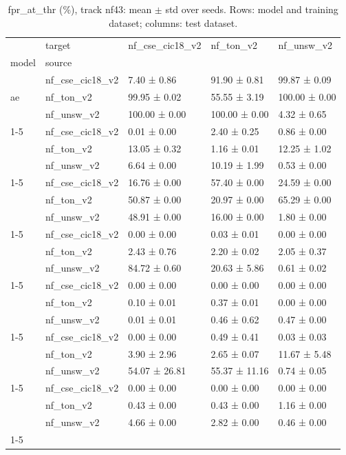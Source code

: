 \begin{table}
\caption{fpr_at_thr (\%), track nf43: mean $\pm$ std over seeds. Rows: model and training dataset; columns: test dataset.}
\label{tab:matrix_nf43_fpr_at_thr}
\begin{tabular}{lllll}
\toprule
 & target & nf_cse_cic18_v2 & nf_ton_v2 & nf_unsw_v2 \\
model & source &  &  &  \\
\midrule
\multirow[t]{3}{*}{ae} & nf_cse_cic18_v2 & 7.40 ± 0.86 & 91.90 ± 0.81 & 99.87 ± 0.09 \\
 & nf_ton_v2 & 99.95 ± 0.02 & 55.55 ± 3.19 & 100.00 ± 0.00 \\
 & nf_unsw_v2 & 100.00 ± 0.00 & 100.00 ± 0.00 & 4.32 ± 0.65 \\
\cline{1-5}
\multirow[t]{3}{*}{dt} & nf_cse_cic18_v2 & 0.01 ± 0.00 & 2.40 ± 0.25 & 0.86 ± 0.00 \\
 & nf_ton_v2 & 13.05 ± 0.32 & 1.16 ± 0.01 & 12.25 ± 1.02 \\
 & nf_unsw_v2 & 6.64 ± 0.00 & 10.19 ± 1.99 & 0.53 ± 0.00 \\
\cline{1-5}
\multirow[t]{3}{*}{lda} & nf_cse_cic18_v2 & 16.76 ± 0.00 & 57.40 ± 0.00 & 24.59 ± 0.00 \\
 & nf_ton_v2 & 50.87 ± 0.00 & 20.97 ± 0.00 & 65.29 ± 0.00 \\
 & nf_unsw_v2 & 48.91 ± 0.00 & 16.00 ± 0.00 & 1.80 ± 0.00 \\
\cline{1-5}
\multirow[t]{3}{*}{mlp} & nf_cse_cic18_v2 & 0.00 ± 0.00 & 0.03 ± 0.01 & 0.00 ± 0.00 \\
 & nf_ton_v2 & 2.43 ± 0.76 & 2.20 ± 0.02 & 2.05 ± 0.37 \\
 & nf_unsw_v2 & 84.72 ± 0.60 & 20.63 ± 5.86 & 0.61 ± 0.02 \\
\cline{1-5}
\multirow[t]{3}{*}{rf} & nf_cse_cic18_v2 & 0.00 ± 0.00 & 0.00 ± 0.00 & 0.00 ± 0.00 \\
 & nf_ton_v2 & 0.10 ± 0.01 & 0.37 ± 0.01 & 0.00 ± 0.00 \\
 & nf_unsw_v2 & 0.01 ± 0.01 & 0.46 ± 0.62 & 0.47 ± 0.00 \\
\cline{1-5}
\multirow[t]{3}{*}{tabnet} & nf_cse_cic18_v2 & 0.00 ± 0.00 & 0.49 ± 0.41 & 0.03 ± 0.03 \\
 & nf_ton_v2 & 3.90 ± 2.96 & 2.65 ± 0.07 & 11.67 ± 5.48 \\
 & nf_unsw_v2 & 54.07 ± 26.81 & 55.37 ± 11.16 & 0.74 ± 0.05 \\
\cline{1-5}
\multirow[t]{3}{*}{xgb} & nf_cse_cic18_v2 & 0.00 ± 0.00 & 0.00 ± 0.00 & 0.00 ± 0.00 \\
 & nf_ton_v2 & 0.43 ± 0.00 & 0.43 ± 0.00 & 1.16 ± 0.00 \\
 & nf_unsw_v2 & 4.66 ± 0.00 & 2.82 ± 0.00 & 0.46 ± 0.00 \\
\cline{1-5}
\bottomrule
\end{tabular}
\end{table}
